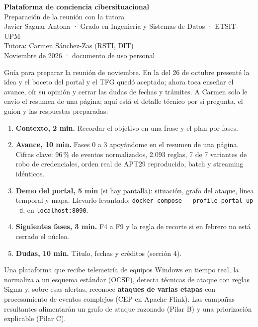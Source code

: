 \documentclass[11pt,a4paper]{article}
\newcommand{\cod}[1]{\texttt{\small #1}}
\begin{document}
\begin{center}
  {\LARGE\bfseries\color{azul} Plataforma de conciencia cibersituacional}\\[4pt]
  {\large Preparación de la reunión con la tutora}\\[10pt]
  {\normalsize Javier Saguar Antona · Grado en Ingeniería y Sistemas de Datos · ETSIT-UPM}\\[2pt]
  {\normalsize Tutora: Carmen Sánchez-Zas (RSTI, DIT)}\\[2pt]
  {\small\color{gris} Noviembre de 2026 · documento de uso personal}
\end{center}

Guía para preparar la reunión de noviembre. En la del 26 de octubre presenté la idea y el boceto del portal y el TFG
quedó aceptado; ahora toca enseñar el avance, oír su opinión y cerrar las dudas de fechas y trámites. A Carmen solo le
envío el resumen de una página; aquí está el detalle técnico por si pregunta, el guion y las respuestas preparadas.

\begin{clave}
\begin{enumerate}[leftmargin=*,itemsep=1pt]
  \item \textbf{Contexto, 2 min.} Recordar el objetivo en una frase y el plan por fases.
  \item \textbf{Avance, 10 min.} Fases 0 a 3 apoyándome en el resumen de una página. Cifras clave: 96\,\% de
        eventos normalizados, 2.093 reglas, 7 de 7 variantes de robo de credenciales, orden real de APT29 reproducido,
        batch y streaming idénticos.
  \item \textbf{Demo del portal, 5 min} (si hay pantalla): situación, grafo del ataque, línea temporal y mapa.
        Llevarlo levantado: \cod{docker compose -{}-profile portal up -d}, en \cod{localhost:8090}.
  \item \textbf{Siguientes fases, 3 min.} F4 a F9 y la regla de recorte si en febrero no está cerrado el núcleo.
  \item \textbf{Dudas, 10 min.} Título, fechas y créditos (sección 4).
\end{enumerate}
\end{clave}

\begin{clave}
Una plataforma que recibe telemetría de equipos Windows en tiempo real, la normaliza a un esquema estándar (OCSF),
detecta técnicas de ataque con reglas Sigma y, sobre esas alertas, reconoce \textbf{ataques de varias etapas} con
procesamiento de eventos complejos (CEP en Apache Flink). Las campañas resultantes alimentarán un grafo de ataque
razonado (Pilar B) y una priorización explicable (Pilar C).
\end{clave}
\end{document}
